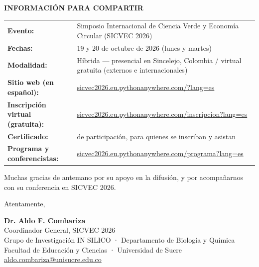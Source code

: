\documentclass[11pt,a4paper]{article}
\begin{document}
\vspace{0.1cm}

\noindent
\textbf{INFORMACIÓN PARA COMPARTIR}

\begin{tabularx}{\linewidth}{@{}l X@{}}
\textbf{Evento:} & Simposio Internacional de Ciencia Verde y Economía Circular (SICVEC 2026) \\
\textbf{Fechas:} & 19 y 20 de octubre de 2026 (lunes y martes) \\
\textbf{Modalidad:} & Híbrida — presencial en Sincelejo, Colombia / virtual gratuita (externos e internacionales) \\
\textbf{Sitio web (en español):} & \href{https://sicvec2026.eu.pythonanywhere.com/?lang=es}{sicvec2026.eu.pythonanywhere.com/?lang=es} \\
\textbf{Inscripción virtual (gratuita):} & \href{https://sicvec2026.eu.pythonanywhere.com/inscripcion?lang=es}{sicvec2026.eu.pythonanywhere.com/inscripcion?lang=es} \\
\textbf{Certificado:} & de participación, para quienes se inscriban y asistan \\
\textbf{Programa y conferencistas:} & \href{https://sicvec2026.eu.pythonanywhere.com/programa?lang=es}{sicvec2026.eu.pythonanywhere.com/programa?lang=es} \\
\end{tabularx}

\vspace{0.1cm}

Muchas gracias de antemano por su apoyo en la difusión, y por acompañarnos con su conferencia en SICVEC 2026.

\vspace{0.15cm}

Atentamente,

\vspace{0.15cm}

\textbf{Dr. Aldo F. Combariza}\\
Coordinador General, SICVEC 2026\\
Grupo de Investigación IN SILICO · Departamento de Biología y Química\\
Facultad de Educación y Ciencias · Universidad de Sucre\\
\href{mailto:aldo.combariza@unisucre.edu.co}{aldo.combariza@unisucre.edu.co}
\end{document}
